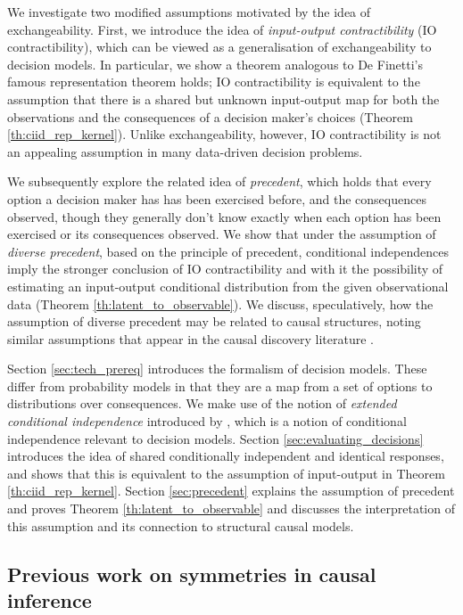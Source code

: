 \documentclass{article}
\begin{document}
We investigate two modified assumptions motivated by the idea of exchangeability. First, we introduce the idea of \emph{input-output contractibility} (IO contractibility), which can be viewed as a generalisation of exchangeability to decision models. In particular, we show a theorem analogous to De Finetti's famous representation \citep{de_finetti_foresight_1992} theorem holds; IO contractibility is equivalent to the assumption that there is a shared but unknown input-output map for both the observations and the consequences of a decision maker's choices (Theorem \ref{th:ciid_rep_kernel}). Unlike exchangeability, however, IO contractibility is not an appealing assumption in many data-driven decision problems.

We subsequently explore the related idea of \emph{precedent}, which holds that every option a decision maker has has been exercised before, and the consequences observed, though they generally don't know exactly when each option has been exercised or its consequences observed.  We show that under the assumption of \emph{diverse precedent}, based on the principle of precedent, conditional independences imply the stronger conclusion of IO contractibility and with it the possibility of estimating an input-output conditional distribution from the given observational data (Theorem \ref{th:latent_to_observable}). We discuss, speculatively, how the assumption of diverse precedent may be related to causal structures, noting similar assumptions that appear in the causal discovery literature \citep{meek_strong_1995, janzingCausalVersionsMaximum2021}.

Section \ref{sec:tech_prereq} introduces the formalism of decision models. These differ from probability models in that they are a map from a set of options to distributions over consequences. We make use of the notion of \emph{extended conditional independence} introduced by \citet{constantinou_extended_2017}, which is a notion of conditional independence relevant to decision models. Section \ref{sec:evaluating_decisions} introduces the idea of shared conditionally independent and identical responses, and shows that this is equivalent to the assumption of input-output in Theorem \ref{th:ciid_rep_kernel}. Section \ref{sec:precedent} explains the assumption of precedent and proves Theorem \ref{th:latent_to_observable} and discusses the interpretation of this assumption and its connection to structural causal models.

\subsection{Previous work on symmetries in causal inference}\label{sec:prev_work}
\end{document}
